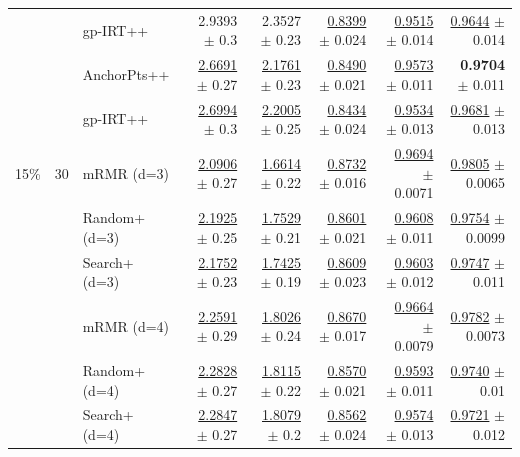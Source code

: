\begin{longtable}{llp{}rrrrr}
 &  & gp-IRT++ & 2.9393 {\scriptsize $\pm$ 0.3} & 2.3527 {\scriptsize $\pm$ 0.23} & \underline{0.8399} {\scriptsize $\pm$ 0.024} & \underline{0.9515} {\scriptsize $\pm$ 0.014} & \underline{0.9644} {\scriptsize $\pm$ 0.014} \\
 &  & AnchorPts++ & \underline{2.6691} {\scriptsize $\pm$ 0.27} & \underline{2.1761} {\scriptsize $\pm$ 0.23} & \underline{0.8490} {\scriptsize $\pm$ 0.021} & \underline{0.9573} {\scriptsize $\pm$ 0.011} & \textbf{0.9704} {\scriptsize $\pm$ 0.011} \\
 &  & gp-IRT++ & \underline{2.6994} {\scriptsize $\pm$ 0.3} & \underline{2.2005} {\scriptsize $\pm$ 0.25} & \underline{0.8434} {\scriptsize $\pm$ 0.024} & \underline{0.9534} {\scriptsize $\pm$ 0.013} & \underline{0.9681} {\scriptsize $\pm$ 0.013} \\
\midrule
15\% & 30 & mRMR (d=3) & \underline{2.0906} {\scriptsize $\pm$ 0.27} & \underline{1.6614} {\scriptsize $\pm$ 0.22} & \underline{0.8732} {\scriptsize $\pm$ 0.016} & \underline{0.9694} {\scriptsize $\pm$ 0.0071} & \underline{0.9805} {\scriptsize $\pm$ 0.0065} \\
 &  & Random+ (d=3) & \underline{2.1925} {\scriptsize $\pm$ 0.25} & \underline{1.7529} {\scriptsize $\pm$ 0.21} & \underline{0.8601} {\scriptsize $\pm$ 0.021} & \underline{0.9608} {\scriptsize $\pm$ 0.011} & \underline{0.9754} {\scriptsize $\pm$ 0.0099} \\
 &  & Search+ (d=3) & \underline{2.1752} {\scriptsize $\pm$ 0.23} & \underline{1.7425} {\scriptsize $\pm$ 0.19} & \underline{0.8609} {\scriptsize $\pm$ 0.023} & \underline{0.9603} {\scriptsize $\pm$ 0.012} & \underline{0.9747} {\scriptsize $\pm$ 0.011} \\
 &  & mRMR (d=4) & \underline{2.2591} {\scriptsize $\pm$ 0.29} & \underline{1.8026} {\scriptsize $\pm$ 0.24} & \underline{0.8670} {\scriptsize $\pm$ 0.017} & \underline{0.9664} {\scriptsize $\pm$ 0.0079} & \underline{0.9782} {\scriptsize $\pm$ 0.0073} \\
 &  & Random+ (d=4) & \underline{2.2828} {\scriptsize $\pm$ 0.27} & \underline{1.8115} {\scriptsize $\pm$ 0.22} & \underline{0.8570} {\scriptsize $\pm$ 0.021} & \underline{0.9593} {\scriptsize $\pm$ 0.011} & \underline{0.9740} {\scriptsize $\pm$ 0.01} \\
 &  & Search+ (d=4) & \underline{2.2847} {\scriptsize $\pm$ 0.27} & \underline{1.8079} {\scriptsize $\pm$ 0.2} & \underline{0.8562} {\scriptsize $\pm$ 0.024} & \underline{0.9574} {\scriptsize $\pm$ 0.013} & \underline{0.9721} {\scriptsize $\pm$ 0.012} \\

\end{longtable}
